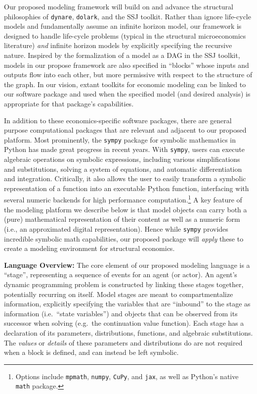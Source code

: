 \documentclass[12pt,pdftex,letterpaper]{article}
\begin{document}
Our proposed modeling framework will build on and advance the structural philosophies of \texttt{dynare}, \texttt{dolark}, and the SSJ toolkit. Rather than ignore life-cycle models and fundamentally assume an infinite horizon model, our framework is  designed to handle life-cycle problems (typical in the structural microeconomics literature) \textit{and} infinite horizon models by explicitly specifying the recursive nature. Inspired by the formalization of a model as a DAG in the SSJ toolkit, models in our propose framework are also specified in ``blocks'' whose inputs and outputs flow into each other, but more permissive with respect to the structure of the graph. In our vision, extant toolkits for economic modeling can be linked to our software package and used when the specified model (and desired analysis) is appropriate for that package's capabilities.

In addition to these economics-specific software packages, there are general purpose computational packages that are relevant and adjacent to our proposed platform. Most prominently, the \texttt{sympy} package for symbolic mathematics in Python has made great progress in recent years. With \texttt{sympy}, users can execute algebraic operations on symbolic expressions, including various simplifications and substitutions, solving a system of equations, and automatic differentiation and integration. Critically, it also allows the user to easily transform a symbolic representation of a function into an executable Python function, interfacing with several numeric backends for high performance computation.\footnote{Options include \texttt{mpmath}, \texttt{numpy}, \texttt{CuPy}, and \texttt{jax}, as well as Python's native \texttt{math} package.} A key feature of the modeling platform we describe below is that model objects can carry both a (pure) mathematical representation of their content as well as a numeric form (i.e., an approximated digital representation). Hence while \texttt{sympy} provides incredible symbolic math capabilities, our proposed package will \textit{apply} these to create a modeling environment for structural economics.

\vspace{0.5cm}

\noindent \textbf{Language Overview:} The core element of our proposed modeling language is a ``stage'', representing a sequence of events for an agent (or actor). An agent's dynamic programming problem is constructed by linking these stages together, potentially recurring on itself. Model stages are meant to compartmentalize information, explicitly specifying the variables that are ``inbound'' to the stage as information (i.e.\ ``state variables'') and objects that can be observed from its successor when solving (e.g.\ the continuation value function). Each stage has a declaration of its parameters, distributions, functions, and algebraic substitutions. The \textit{values} or \textit{details} of these parameters and distributions do are not required when a block is defined, and can instead be left symbolic.
\end{document}
